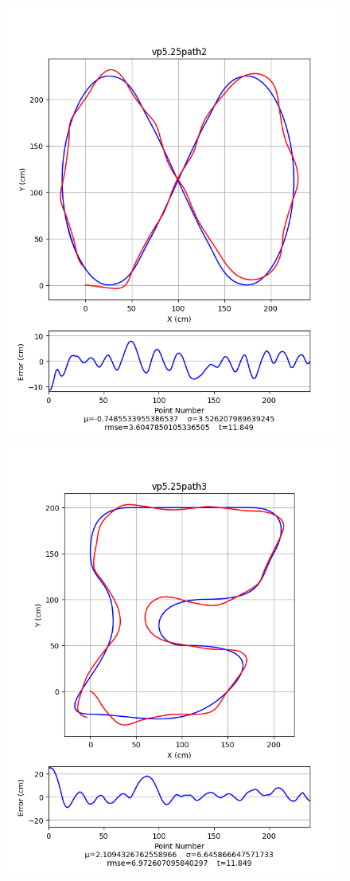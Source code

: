 \documentclass[mla8alt]{mla}
\begin{document}
\begin{paper}
\begin{figure}[H]
\includegraphics[width=\linewidth]{pathData/vppath2}
\endminipage\\
\includegraphics[width=\linewidth]{pathData/vppath3}

\end{figure}
\end{paper}
\end{document}
